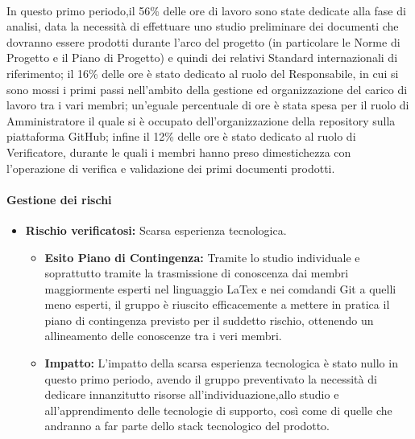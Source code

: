 \paragraph{}
In questo primo periodo,il 56\% delle ore di lavoro sono state dedicate alla fase di analisi,
data la necessità di effettuare uno studio preliminare dei documenti che dovranno essere prodotti durante
l'arco del progetto (in particolare le Norme di Progetto e il Piano di Progetto) e quindi dei relativi Standard
internazionali di riferimento; il 16\% delle ore è stato dedicato al ruolo del Responsabile, in cui si sono mossi i primi 
passi nell'ambito della gestione ed organizzazione del carico di lavoro tra i vari membri; un'eguale percentuale di ore 
è stata spesa per il ruolo di Amministratore il quale si è occupato dell'organizzazione della repository sulla piattaforma GitHub; infine il 12\% delle ore è stato dedicato al ruolo di Verificatore,
durante le quali i membri hanno preso dimestichezza con l'operazione di verifica e validazione dei primi documenti prodotti.

\paragraph{Gestione dei rischi}

\begin{itemize}
\item \textbf{Rischio verificatosi:} Scarsa esperienza tecnologica.
\begin{itemize}
\item \textbf{Esito Piano di Contingenza:} Tramite lo studio individuale e soprattutto tramite la trasmissione di conoscenza dai membri maggiormente esperti nel linguaggio LaTex e nei comdandi Git
a quelli meno esperti, il gruppo è riuscito efficacemente a mettere in pratica il piano di contingenza previsto per il suddetto
rischio, ottenendo un allineamento delle conoscenze tra i veri membri.\\
\item \textbf{Impatto:} L'impatto della scarsa esperienza tecnologica è stato nullo in questo primo periodo, 
avendo il gruppo preventivato la necessità di dedicare innanzitutto risorse all'individuazione,allo studio e all'apprendimento
delle tecnologie di supporto, così come di quelle che andranno a far parte dello stack tecnologico del prodotto.\\ 
\end{itemize}
\end{itemize}

